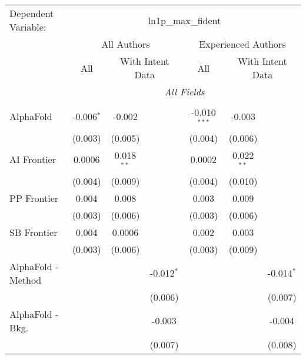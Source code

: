 \begingroup
\centering
\begin{tabular}{lcccccc}
   \tabularnewline \midrule \midrule
   Dependent Variable: & \multicolumn{6}{c}{ln1p\_max\_fident}\\
 & \multicolumn{3}{c}{All Authors} & \multicolumn{3}{c}{Experienced Authors} \\
\cmidrule(lr){2-4} \cmidrule(lr){5-7}
 & \multicolumn{1}{c}{All} & \multicolumn{2}{c}{With Intent Data} & \multicolumn{1}{c}{All} & \multicolumn{2}{c}{With Intent Data} \\
\cmidrule(lr){2-2} \cmidrule(lr){3-4} \cmidrule(lr){5-5} \cmidrule(lr){6-7}
 & \multicolumn{6}{c}{\textit{All Fields}} \\ \\
   AlphaFold            & -0.006$^{*}$ & -0.002       &              & -0.010$^{***}$ & -0.003       &   \\   
                        & (0.003)      & (0.005)      &              & (0.004)        & (0.006)      &   \\   
   AI Frontier          & 0.0006       & 0.018$^{**}$ &              & 0.0002         & 0.022$^{**}$ &   \\   
                        & (0.004)      & (0.009)      &              & (0.004)        & (0.010)      &   \\   
   PP Frontier          & 0.004        & 0.008        &              & 0.003          & 0.009        &   \\   
                        & (0.003)      & (0.006)      &              & (0.003)        & (0.006)      &   \\   
   SB Frontier          & 0.004        & 0.0006       &              & 0.002          & 0.003        &   \\   
                        & (0.003)      & (0.006)      &              & (0.003)        & (0.009)      &   \\   
   AlphaFold - Method   &              &              & -0.012$^{*}$ &                &              & -0.014$^{*}$\\   
                        &              &              & (0.006)      &                &              & (0.007)\\   
   AlphaFold - Bkg.     &              &              & -0.003       &                &              & -0.004\\   
                        &              &              & (0.007)      &                &              & (0.008)\\   

\end{tabular}
